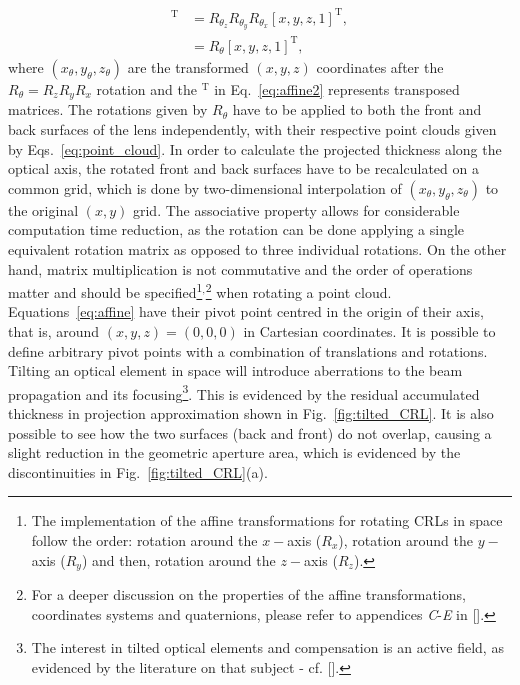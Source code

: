 \begin{refsection}
\begin{align}
    [x_\theta,y_\theta,z_\theta,1]^\text{T} & = R_{\theta_z}R_{\theta_y}R_{\theta_x}[x,y,z,1]^\text{T},\nonumber \\
     & = R_\theta[x,y,z,1]^\text{T},
\end{align}{}
where $(x_\theta,y_\theta,z_\theta)$ are the transformed $(x,y,z)$ coordinates after the $R_{\theta}=R_zR_yR_x$ rotation and the $^\text{T}$ in Eq.~\ref{eq:affine2} represents transposed matrices. The rotations given by $R_{\theta}$ have to be applied to both the front and back surfaces of the lens independently, with their respective point clouds given by Eqs.~\ref{eq:point_cloud}. In order to calculate the projected thickness along the optical axis, the rotated front and back surfaces have to be recalculated on a common grid, which is done by two-dimensional interpolation of $(x_\theta,y_\theta,z_\theta)$ to the original $(x,y)$ grid. The associative property allows for considerable computation time reduction, as the rotation can be done applying a single equivalent rotation matrix as opposed to three individual rotations. On the other hand, matrix multiplication is not commutative and the order of operations matter and should be specified\footnote{The implementation of the affine transformations for rotating CRLs in space follow the order: rotation around the $x-$axis ($R_x$), rotation around the $y-$axis ($R_y$) and then, rotation around the $z-$axis ($R_z$).}$^{,}$\footnote{For a deeper discussion on the properties of the affine transformations, coordinates systems and quaternions, please refer to appendices \textit{C}-\textit{E} in [\cite{House2016}].} when rotating a point cloud. Equations~\ref{eq:affine} have their pivot point centred in the origin of their axis, that is, around $(x,y,z)=(0,0,0)$ in Cartesian coordinates. It is possible to define arbitrary pivot points with a combination of translations and rotations. Tilting an optical element in space will introduce aberrations to the beam propagation and its focusing\footnote{The interest in tilted optical elements and compensation is an active field, as evidenced by the literature on that subject - cf. [\cite{Guizar-Sicairos2011,Zhou2019,Ali2020}].}. This is evidenced by the residual accumulated thickness in projection approximation shown in Fig.~\ref{fig:tilted_CRL}. It is also possible to see how the two surfaces (back and front) do not overlap, causing a slight reduction in the geometric aperture area, which is evidenced by the discontinuities in Fig.~\ref{fig:tilted_CRL}(a).
\begin{figure}[t]
        \centering

\end{figure}
\end{refsection}
